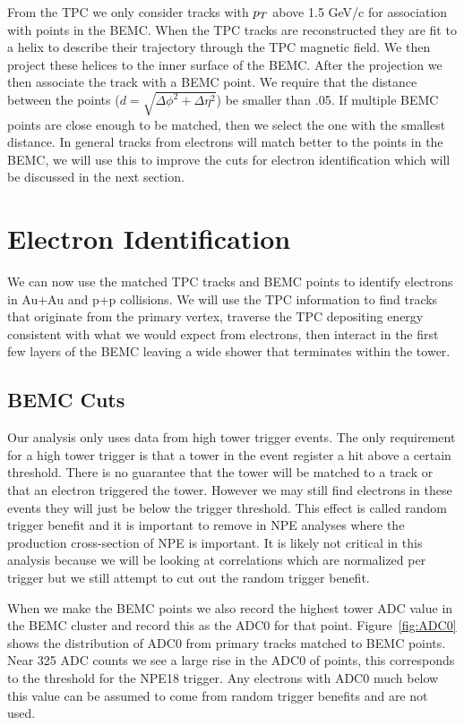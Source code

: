 From the TPC we only consider tracks with $p_{T}$ above 1.5 GeV/c for association with points in the BEMC. When the TPC tracks are reconstructed they are fit to a helix to describe their trajectory through the TPC magnetic field. We then project these helices to the inner surface of the BEMC. After the projection we then associate the track with a BEMC point. We require that the distance between the points ($d = \sqrt{\Delta\phi^2 + \Delta\eta^2}$) be smaller than .05. If multiple BEMC points are close enough to be matched, then we select the one with the smallest distance. In general tracks from electrons will match better to the points in the BEMC, we will use this to improve the cuts for electron identification which will be discussed in the next section.

\section{Electron Identification}

We can now use the matched TPC tracks and BEMC points to identify electrons in Au+Au and p+p collisions. We will use the TPC information to find tracks that originate from the primary vertex, traverse the TPC depositing energy consistent with what we would expect from electrons, then interact in the first few layers of the BEMC leaving a wide shower that terminates within the tower.

\subsection{BEMC Cuts}

Our analysis only uses data from high tower trigger events. The only requirement for a high tower trigger is that a tower in the event register a hit above a certain threshold. There is no guarantee that the tower will be matched to a track or that an electron triggered the tower. However we may still find electrons in these events they will just be below the trigger threshold. This effect is called random trigger benefit and it is important to remove in NPE analyses where the production cross-section of NPE is important. It is likely not critical in this analysis because we will be looking at correlations which are normalized per trigger but we still attempt to cut out the random trigger benefit. 

When we make the BEMC points we also record the highest tower ADC value in the BEMC cluster and record this as the ADC0 for that point. Figure~\ref{fig:ADC0} shows the distribution of ADC0 from primary tracks matched to BEMC points. Near 325 ADC counts we see a large rise in the ADC0 of points, this corresponds to the threshold for the NPE18 trigger. Any electrons with ADC0 much below this value can be assumed to come from random trigger benefits and are not used. 

